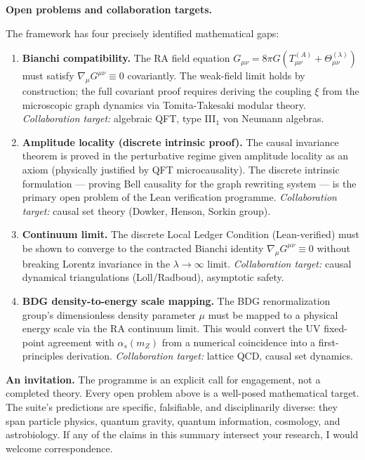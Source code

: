 \documentclass[11pt]{article}
\begin{document}
\bigskip

\noindent\textbf{Open problems and collaboration targets.}

The framework has four precisely identified mathematical gaps:

\begin{enumerate}[itemsep=3pt,leftmargin=*]

\item \textbf{Bianchi compatibility.} The RA field equation
$G_{\mu\nu} = 8\pi G(T^{(A)}_{\mu\nu} + \Theta^{(\lambda)}_{\mu\nu})$
must satisfy $\nabla_\mu G^{\mu\nu} \equiv 0$ covariantly.
The weak-field limit holds by construction; the full covariant proof
requires deriving the coupling $\xi$ from the microscopic graph dynamics
via Tomita-Takesaki modular theory.
\textit{Collaboration target:} algebraic QFT, type III$_1$ von Neumann algebras.

\item \textbf{Amplitude locality (discrete intrinsic proof).}
The causal invariance theorem is proved in the perturbative regime
given amplitude locality as an axiom (physically justified by QFT
microcausality).
The discrete intrinsic formulation — proving Bell causality for the
graph rewriting system — is the primary open problem of the Lean
verification programme.
\textit{Collaboration target:} causal set theory (Dowker, Henson, Sorkin group).

\item \textbf{Continuum limit.}
The discrete Local Ledger Condition (Lean-verified) must be shown to
converge to the contracted Bianchi identity $\nabla_\mu G^{\mu\nu}
\equiv 0$ without breaking Lorentz invariance in the
$\lambda \to \infty$ limit.
\textit{Collaboration target:} causal dynamical triangulations (Loll/Radboud),
asymptotic safety.

\item \textbf{BDG density-to-energy scale mapping.}
The BDG renormalization group's dimensionless density parameter $\mu$
must be mapped to a physical energy scale via the RA continuum limit.
This would convert the UV fixed-point agreement with $\alpha_s(m_Z)$
from a numerical coincidence into a first-principles derivation.
\textit{Collaboration target:} lattice QCD, causal set dynamics.

\end{enumerate}

\bigskip

\noindent\textbf{An invitation.}
The programme is an explicit call for engagement, not a completed theory.
Every open problem above is a well-posed mathematical target.
The suite's predictions are specific, falsifiable, and disciplinarily
diverse: they span particle physics, quantum gravity, quantum information,
cosmology, and astrobiology.
If any of the claims in this summary intersect your research,
I would welcome correspondence.
\end{document}
